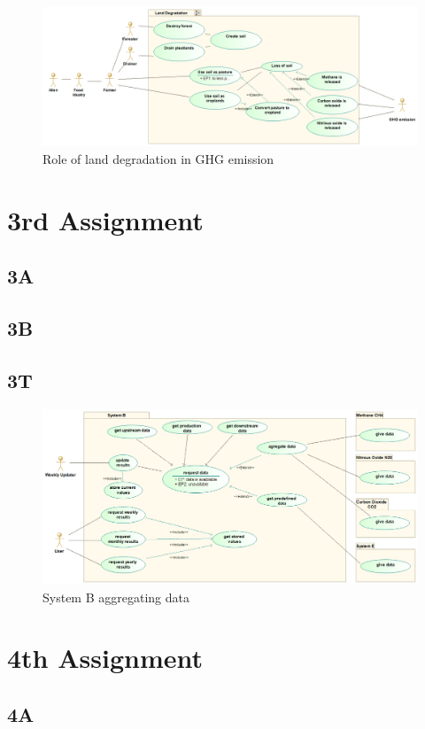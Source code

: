 \documentclass{Gharaei}
\begin{document}
\begin{figure}[H]
    \centering
    \includegraphics[width=\textwidth-2cm]{2ndUCdiagramm.png}
    \caption{Role of land degradation in GHG emission}
    \label{landDegradationGHG}
\end{figure}
 
\section{3rd Assignment}
\subsection{3A}
\subsection{3B}
\subsection{3T}
\begin{figure}[H]
    \centering
    \includegraphics[height=\textheight-4cm]{3rdBUCdiagramm.png}
    \caption{System B aggregating data}
    \label{SysB}
\end{figure}
\section{4th Assignment}
\subsection{4A}
\end{document}
